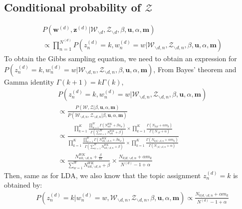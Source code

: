 \documentclass[a4paper]{article}
\begin{document}
  \subsection{Conditional probability of $\mathcal{Z}$} \label{subsec: conditional probability Z}
  \begin{equation*}
  \begin{aligned}
  & P(\boldsymbol{w}^{(d)}, \boldsymbol{z}^{(d)}|\mathcal{W}_{\backslash d}, \mathcal{Z}_{\backslash d}, \beta, \boldsymbol{u}, \alpha, \boldsymbol{m}) \\& \propto \prod_{n=1}^{N^{(d)}}P(z^{(d)}_n=k, w^{(d)}_n=w| \mathcal{W}_{\backslash d, n}, \mathcal{Z}_{\backslash d, n}, \beta, \boldsymbol{u}, \alpha, \boldsymbol{m})
  \end{aligned}
  \end{equation*} 
  To obtain the Gibbs sampling equation, we need to obtain an expression for $P(z^{(d)}_n=k,  w^{(d)}_n=w|\mathcal{W}_{\backslash d, n}, \mathcal{Z}_{\backslash d, n}, \beta, \boldsymbol{u}, \alpha, \boldsymbol{m})$,
  From Bayes' theorem and Gamma identity $\Gamma(k+1)=k\Gamma(k)$,
  \begin{equation*}
  \begin{aligned}
  & P(z^{(d)}_n=k, w^{(d)}_n=w|\mathcal{W}_{\backslash d, n}, \mathcal{Z}_{\backslash d, n}, \beta, \boldsymbol{u}, \alpha, \boldsymbol{m}) \\& \propto 
  \frac{P(\mathcal{W}, \mathcal{Z}|\beta, \boldsymbol{u}, \alpha, \boldsymbol{m})}{P(\mathcal{W}_{\backslash d, n}, \mathcal{Z}_{\backslash d, n}|\beta, \boldsymbol{u}, \alpha, \boldsymbol{m})}\\& \propto \frac{\prod_{k=1}^{K}\frac{\prod_{w=1}^W\Gamma(N_{wk}^{WK}+\beta u_w)}{\Gamma(\sum_{w=1}^WN_{wk}^{WK}+\beta )}\times\prod_{k=1}^K\frac{\Gamma(N_{k|d}+\alpha m_k)}{\Gamma(N_{\cdot|d}+\alpha)}}{\prod_{k=1}^{K}\frac{\prod_{w=1}^W\Gamma(N_{wk, \backslash d, n}^{WK}+\beta u_w)}{\Gamma(\sum_{w=1}^WN_{wk, \backslash d, n}^{WK}+\beta )}\times\prod_{k=1}^K\frac{\Gamma(N_{k|d, \backslash d, n}+\alpha m_k)}{\Gamma(N_{\cdot|d, \backslash d, n}+\alpha)}}\\ & \propto 
  \frac{N_{wk, \backslash d, n}^{WK}+\frac{\beta}{W}}{\sum_{w=1}^WN_{wk,  \backslash d, n}^{WK}+\beta}\times\frac{N_{k|d, \backslash d, n}+\alpha m_k}{N^{(d)}-1+\alpha}
  \end{aligned}
  \end{equation*}
  Then, same as for LDA, we also know that the topic assignment $z_n^{(d)}=k$ is obtained by:
  \begin{equation*}
  \begin{aligned}
  &P(z^{(d)}_n=k|w^{(d)}_n=w, \mathcal{W}_{\backslash d, n}, \mathcal{Z}_{\backslash d,n}, \beta, \boldsymbol{u}, \alpha, \boldsymbol{m}) \propto
  \frac{N_{k|d, \backslash d, n}+\alpha m_k}{N^{(d)}-1+\alpha}
  \end{aligned}
  \end{equation*}
\end{document}

